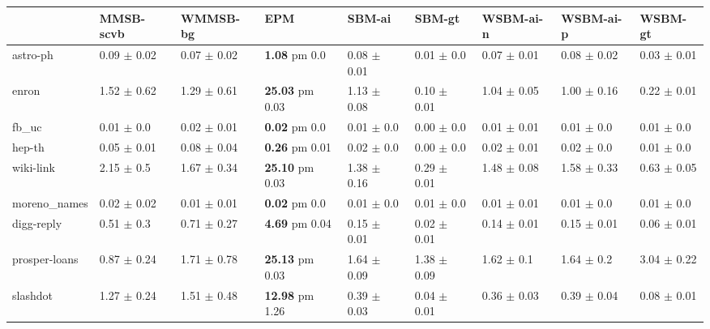 \begin{tabular}{lllllllll}
\hline
& MMSB-scvb                 & WMMSB-bg & EPM                  & SBM-ai           & SBM-gt           & WSBM-ai-n        & WSBM-ai-p        & WSBM-gt                   \\
\hline
astro-ph      & 0.09 $\pm$ 0.02    & 0.07 $\pm$ 0.02    & \textbf{1.08} pm 0.0    & 0.08 $\pm$ 0.01 & 0.01 $\pm$ 0.0  & 0.07 $\pm$ 0.01 & 0.08 $\pm$ 0.02 & 0.03 $\pm$ 0.01          \\
enron         & 1.52 $\pm$ 0.62    & 1.29 $\pm$ 0.61    & \textbf{25.03} pm 0.03  & 1.13 $\pm$ 0.08 & 0.10 $\pm$ 0.01 & 1.04 $\pm$ 0.05 & 1.00 $\pm$ 0.16 & 0.22 $\pm$ 0.01          \\
fb\_uc         & 0.01 $\pm$ 0.0    & 0.02 $\pm$ 0.01    & \textbf{0.02} pm 0.0     & 0.01 $\pm$ 0.0  & 0.00 $\pm$ 0.0  & 0.01 $\pm$ 0.01  & 0.01 $\pm$ 0.0  & 0.01 $\pm$ 0.0           \\
hep-th        & 0.05 $\pm$ 0.01    & 0.08 $\pm$ 0.04    & \textbf{0.26} pm 0.01   & 0.02 $\pm$ 0.0  & 0.00 $\pm$ 0.0  & 0.02 $\pm$ 0.01  & 0.02 $\pm$ 0.0  & 0.01 $\pm$ 0.0           \\
wiki-link     & 2.15 $\pm$ 0.5     & 1.67 $\pm$ 0.34    & \textbf{25.10} pm 0.03  & 1.38 $\pm$ 0.16 & 0.29 $\pm$ 0.01 & 1.48 $\pm$ 0.08 & 1.58 $\pm$ 0.33 & 0.63 $\pm$ 0.05          \\
moreno\_names  & 0.02 $\pm$ 0.02   & 0.01 $\pm$ 0.01    & \textbf{0.02} pm 0.0     & 0.01 $\pm$ 0.0  & 0.01 $\pm$ 0.0  & 0.01 $\pm$ 0.01  & 0.01 $\pm$ 0.0  & 0.01 $\pm$ 0.0           \\
digg-reply    & 0.51 $\pm$ 0.3     & 0.71 $\pm$ 0.27    & \textbf{4.69} pm 0.04   & 0.15 $\pm$ 0.01 & 0.02 $\pm$ 0.01 & 0.14 $\pm$ 0.01 & 0.15 $\pm$ 0.01 & 0.06 $\pm$ 0.01          \\
prosper-loans & 0.87 $\pm$ 0.24    & 1.71 $\pm$ 0.78    & \textbf{25.13} pm 0.03  & 1.64 $\pm$ 0.09 & 1.38 $\pm$ 0.09 & 1.62 $\pm$ 0.1  & 1.64 $\pm$ 0.2  & 3.04 $\pm$ 0.22 \\
slashdot      & 1.27 $\pm$ 0.24    & 1.51 $\pm$ 0.48    & \textbf{12.98} pm 1.26  & 0.39 $\pm$ 0.03 & 0.04 $\pm$ 0.01 & 0.36 $\pm$ 0.03 & 0.39 $\pm$ 0.04 & 0.08 $\pm$ 0.01          \\
\hline
\end{tabular}

